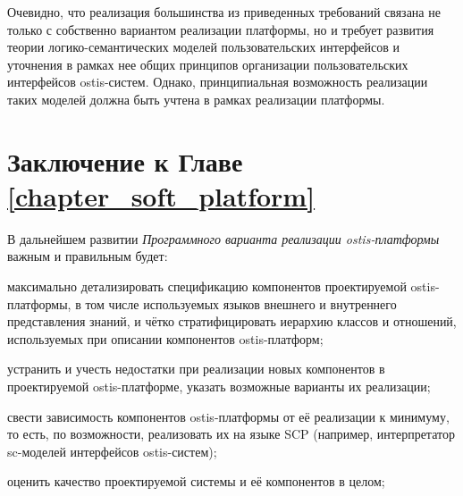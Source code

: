 Очевидно, что реализация большинства из приведенных требований связана не только с собственно вариантом реализации платформы, но и требует развития теории логико-семантических моделей пользовательских интерфейсов и уточнения в рамках нее общих принципов организации пользовательских интерфейсов ostis-систем. Однако, принципиальная возможность реализации таких моделей должна быть учтена в рамках реализации платформы.

\section*{Заключение к Главе \ref{chapter_soft_platform}}
\label{sec_soft_platform_plans_and_tasks}

В дальнейшем развитии \textit{Программного варианта реализации ostis-платформы} важным и правильным будет:
\begin{textitemize}
    \item максимально детализировать спецификацию компонентов проектируемой ostis-платформы, в том числе используемых языков внешнего и внутреннего представления знаний, и чётко стратифицировать иерархию классов и отношений, используемых при описании компонентов ostis-платформ;
    \item устранить и учесть недостатки при реализации новых компонентов в проектируемой ostis-платформе, указать возможные варианты их реализации;
    \item свести зависимость компонентов ostis-платформы от её реализации к минимуму, то есть, по возможности, реализовать их на языке SCP (например, интерпретатор sc-моделей интерфейсов ostis-систем);
    \item оценить качество проектируемой системы и её компонентов в целом;
\end{textitemize}